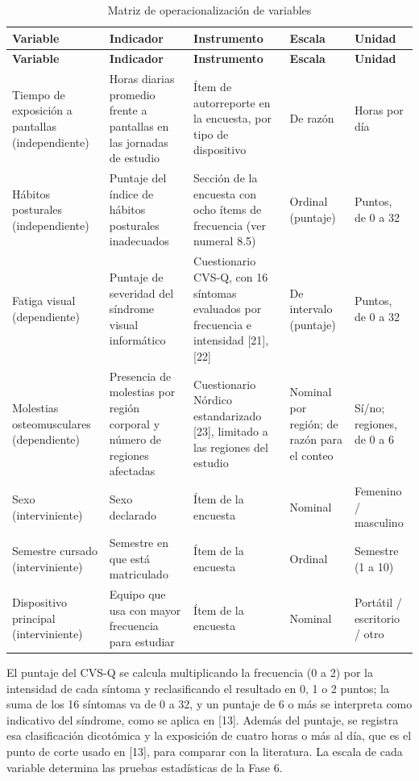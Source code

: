\bigskip
\begin{center}
\small
\setlength{\tabcolsep}{3pt}
\begin{longtable}{L{2.6cm} L{3.6cm} L{3.8cm} L{2cm} L{2.4cm}}
\caption{Matriz de operacionalización de variables}\label{tab:operacionalizacion} \\
\toprule
\textbf{Variable} & \textbf{Indicador} & \textbf{Instrumento} & \textbf{Escala} & \textbf{Unidad} \\
\midrule
\endfirsthead
\toprule
\textbf{Variable} & \textbf{Indicador} & \textbf{Instrumento} & \textbf{Escala} & \textbf{Unidad} \\
\midrule
\endhead
Tiempo de exposición a pantallas (independiente) & Horas diarias promedio frente a pantallas en las jornadas de estudio & Ítem de autorreporte en la encuesta, por tipo de dispositivo & De razón & Horas por día \\
\midrule
Hábitos posturales (independiente) & Puntaje del índice de hábitos posturales inadecuados & Sección de la encuesta con ocho ítems de frecuencia (ver numeral 8.5) & Ordinal (puntaje) & Puntos, de 0 a 32 \\
\midrule
Fatiga visual (dependiente) & Puntaje de severidad del síndrome visual informático & Cuestionario CVS-Q, con 16 síntomas evaluados por frecuencia e intensidad [21], [22] & De intervalo (puntaje) & Puntos, de 0 a 32 \\
\midrule
Molestias osteomusculares (dependiente) & Presencia de molestias por región corporal y número de regiones afectadas & Cuestionario Nórdico estandarizado [23], limitado a las regiones del estudio & Nominal por región; de razón para el conteo & Sí/no; regiones, de 0 a 6 \\
\midrule
Sexo (interviniente) & Sexo declarado & Ítem de la encuesta & Nominal & Femenino / masculino \\
\midrule
Semestre cursado (interviniente) & Semestre en que está matriculado & Ítem de la encuesta & Ordinal & Semestre (1 a 10) \\
\midrule
Dispositivo principal (interviniente) & Equipo que usa con mayor frecuencia para estudiar & Ítem de la encuesta & Nominal & Portátil / escritorio / otro \\
\bottomrule
\end{longtable}
\end{center}

\noindent El puntaje del CVS-Q se calcula multiplicando la frecuencia (0 a 2) por la
intensidad de cada síntoma y reclasificando el resultado en 0, 1 o 2 puntos; la suma de
los 16 síntomas va de 0 a 32, y un puntaje de 6 o más se interpreta como indicativo del
síndrome, como se aplica en [13]. Además del puntaje, se registra esa clasificación
dicotómica y la exposición de cuatro horas o más al día, que es el punto de corte usado en
[13], para comparar con la literatura. La escala de cada variable determina las pruebas
estadísticas de la Fase 6.


